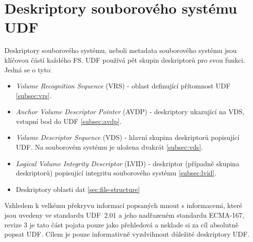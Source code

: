\section{Deskriptory souborového systému UDF}
\label{sec:deskriptory-udf}
Deskriptory souborového systému, neboli metadata souborového systému jsou klíčovou částí každého FS. UDF používá pět skupin deskriptorů pro svou funkci. Jedná se o tyto:
\begin{itemize}
    \item \textit{Volume Recognition Sequence} (VRS) - oblast definující přítomnost UDF \ref{subsec:vrs}.
    \item \textit{Anchor Volume Descriptor Pointer} (AVDP) - deskriptory ukazující na VDS, vstupní bod do UDF \ref{subsec:avdp}.
    \item \textit{Volume Descriptor Sequence} (VDS) - hlavní skupina deskriptorů popisující UDF. Na souborovém systému je uložena dvakrát \ref{subsec:vds}.
    \item \textit{Logical Volume Integrity Descriptor} (LVID) - deskriptor (případně skupina deskriptorů) popisující integritu souborového systému \ref{subsec:lvid}. 
    \item Deskriptory oblasti dat \ref{sec:file-structure}
\end{itemize}
Vzhledem k velkému překryvu informací popsaných mnout s informacemi, které jsou uvedeny ve standardu UDF~2.01 \cite{osta-udf-0201} a jeho nadřazeném standardu ECMA-167, revize 3 \cite{ecma-167} je tato část pojata pouze jako přehledová a neklade si za cíl absolutně popsat UDF. Cílem je pouze informativně vyzdvihnout důležité deskriptory UDF.

